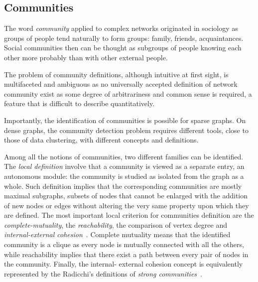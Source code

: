 \subsection{Communities}\label{sec:communities}
The word \emph{community} applied to complex networks originated in sociology as groups of people tend naturally to form groups: family, friends, acquaintances.
Social communities then can be thought as subgroups of people knowing each other more probably than with other external people.

The problem of community definitions, although intuitive at first sight, is multifaceted and ambiguous as no universally accepted definition of network community exist as some degree of arbitrariness and common sense is required, a feature that is difficult to describe quantitatively.

Importantly, the identification of communities is possible for sparse graphs.
On dense graphs, the community detection problem requires different tools, close to those of data clustering, with different concepts and definitions.

Among all the notions of communities, two different families can be identified.
The \emph{local definition} involve that a community is viewed as a separate entry, an autonomous module: the community is studied as isolated from the graph as a whole.
Such definition implies that the corresponding communities are mostly maximal subgraphs, subsets of nodes that cannot be enlarged with the addition of new nodes or edges without altering the very same property upon which they are defined.
The most important local criterion for communities definition are the \emph{complete-mutuality}, the \emph{reachability}, the comparison of vertex degree and \emph{internal-external cohesion}~\cite{wasserman1994,alba1973}.
Complete mutuality means that the identified community is a clique as every node is mutually connected with all the others, while reachability implies that there exist a path between every pair of nodes in the community.
Finally, the internal- external cohesion concept is equivalently represented by the Radicchi's definitions of \emph{strong communities}~\cite{radicchi2004}.

